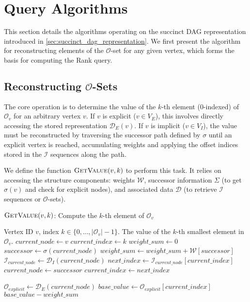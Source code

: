 \section{Query Algorithms}
\label{sec:query_algorithms}

This section details the algorithms operating on the succinct DAG representation introduced in \autoref{sec:succinct_dag_representation}. We first present the algorithm for reconstructing elements of the $\mathcal{O}$-set for any given vertex, which forms the basis for computing the Rank query.

\subsection{Reconstructing $\mathcal{O}$-Sets}
\label{subsec:reconstructing_o_sets}

The core operation is to determine the value of the $k$-th element (0-indexed) of $\mathcal{O}_v$ for an arbitrary vertex $v$. If $v$ is explicit ($v \in V_E$), this involves directly accessing the stored representation $\mathcal{D}_E(v)$. If $v$ is implicit ($v \in V_I$), the value must be reconstructed by traversing the successor path defined by $\sigma$ until an explicit vertex is reached, accumulating weights and applying the offset indices stored in the $\mathcal{I}$ sequences along the path.

We define the function $\textsc{GetValue}(v, k)$ to perform this task. It relies on accessing the structure components: weights $\mathcal{W}$, successor information $\Sigma$ (to get $\sigma(v)$ and check for explicit nodes), and associated data $\mathcal{D}$ (to retrieve $\mathcal{I}$ sequences or $\mathcal{O}$-sets).

\begin{algorithm}
    \caption{$\textsc{GetValue}(v, k)$: Compute the $k$-th element of $\mathcal{O}_v$}
    \label{alg:get_value}
    \small
    \begin{algorithmic}[1]
        \Require Vertex ID $v$, index $k \in \{0, \dots, |\mathcal{O}_v|-1\}$.
        \Ensure The value of the $k$-th smallest element in $\mathcal{O}_v$.
        \State $current\_node \gets v$
        \State $current\_index \gets k$
        \State $weight\_sum \gets 0$
        \State $successor \gets \sigma(current\_node)$
        \State $weight\_sum \gets weight\_sum + \mathcal{W}[successor]$
        \State $\mathcal{I}_{current\_node} \gets \mathcal{D}_I(current\_node)$
        \State $next\_index \gets \mathcal{I}_{current\_node}[current\_index]$
        \State $current\_node \gets successor$
        \State $current\_index \gets next\_index$
        \EndWhile

        \State $\mathcal{O}_{explicit} \gets \mathcal{D}_E(current\_node)$
        \State $base\_value \gets \mathcal{O}_{explicit}[current\_index]$
        \State \Return $base\_value - weight\_sum$
    \end{algorithmic}
\end{algorithm}

